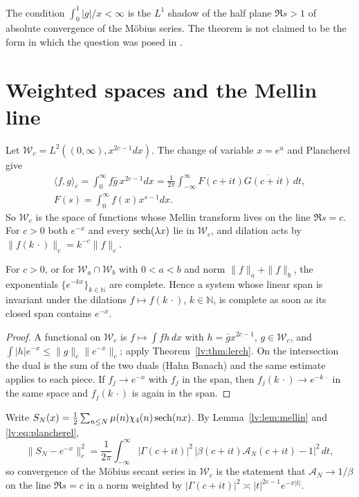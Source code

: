 The condition $\int_0^1|g|/x<\infty$ is the $L^1$ shadow of the half plane $\Re s>1$ of absolute convergence of the M\"obius series. The theorem is not claimed to be the form in which the question was posed in \cite{LVJ}.

\section{Weighted spaces and the Mellin line}\label{lv:sec:weights}

Let $\mathcal W_c=L^2((0,\infty),x^{2c-1}dx)$. The change of variable $x=e^u$ and Plancherel give
\begin{equation}\label{lv:eq:plancherel}
\begin{gathered}\langle f,g\rangle_c=\int_0^\infty f\bar g\,x^{2c-1}dx=\frac1{2\pi}\int_{-\infty}^\infty F(c+it)\overline{G(c+it)}\,dt,\\ F(s)=\int_0^\infty f(x)x^{s-1}dx .
\end{gathered}\end{equation}
So $\mathcal W_c$ is the space of functions whose Mellin transform lives on the line $\Re s=c$. For $c>0$ both $e^{-x}$ and every $\operatorname{sech}(\lambda x)$ lie in $\mathcal W_c$, and dilation acts by $\|f(k\,\cdot)\|_c=k^{-c}\|f\|_c$.

\begin{lemma}[reduction]\label{lv:lem:reduction}
For $c>0$, or for $\mathcal W_a\cap\mathcal W_b$ with $0<a<b$ and norm $\|f\|_a+\|f\|_b$, the exponentials $\{e^{-kx}\}_{k\in\mathbb N}$ are complete. Hence a system whose linear span is invariant under the dilations $f\mapsto f(k\,\cdot)$, $k\in\mathbb N$, is complete as soon as its closed span contains $e^{-x}$.
\end{lemma}

\begin{proof}
A functional on $\mathcal W_c$ is $f\mapsto\int fh\,dx$ with $h=\bar gx^{2c-1}$, $g\in\mathcal W_c$, and $\int|h|e^{-x}\le\|g\|_c\|e^{-x}\|_c$; apply Theorem~\ref{lv:thm:lerch}. On the intersection the dual is the sum of the two duals (Hahn Banach) and the same estimate applies to each piece. If $f_j\to e^{-x}$ with $f_j$ in the span, then $f_j(k\,\cdot)\to e^{-k\,\cdot}$ in the same space and $f_j(k\,\cdot)$ is again in the span.
\end{proof}

Write $S_N(x)=\frac12\sum_{n\le N}\mu(n)\chi_4(n)\operatorname{sech}(nx)$. By Lemma~\ref{lv:lem:mellin} and \eqref{lv:eq:plancherel},
\begin{equation}\label{lv:eq:error}
\|S_N-e^{-x}\|_c^2=\frac1{2\pi}\int_{-\infty}^\infty|\Gamma(c+it)|^2\,\bigl|\beta(c+it)\mathcal A_N(c+it)-1\bigr|^2\,dt,
\end{equation}
so convergence of the M\"obius secant series in $\mathcal W_c$ is the statement that $\mathcal A_N\to1/\beta$ on the line $\Re s=c$ in a norm weighted by $|\Gamma(c+it)|^2\asymp|t|^{2c-1}e^{-\pi|t|}$.

